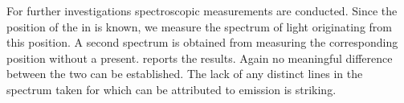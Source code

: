 		For further investigations spectroscopic measurements are conducted. Since the position of the \nd in \BmFour is known, we measure the spectrum of light originating from this position. A second spectrum is obtained from \BmTwo measuring the corresponding position without a \nd present.  reports the results. Again no meaningful difference between the two \VCSELs can be established. The lack of any distinct lines in the spectrum taken for \BmFour{} which can be attributed to \siv emission is striking.

			\begin{figure}[!htb]
				\begin{subfigure}[t]{ 0.49\linewidth}
					\centering
					\caption{}
					\label{subfig::spectrum_vcsel_excitation_with_diamond}
				\end{subfigure}
				\hfill
				\begin{subfigure}[t]{ 0.49\linewidth}
					\centering

\end{subfigure}
\end{figure}
